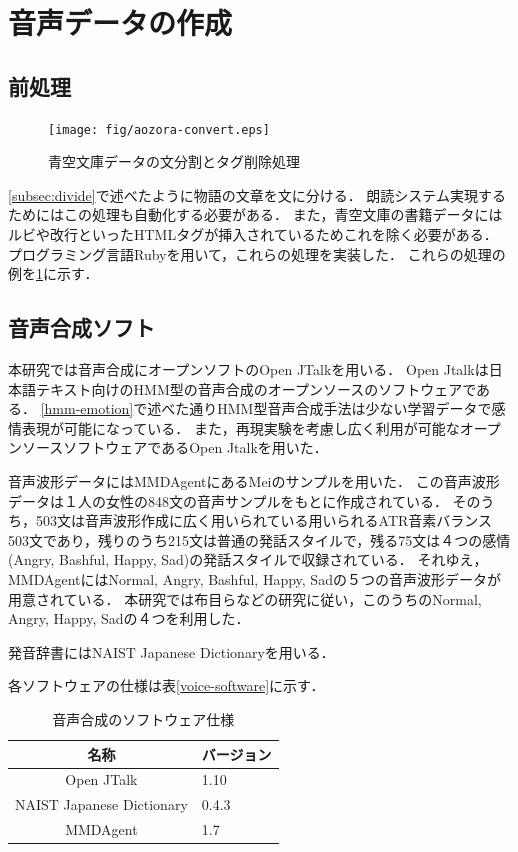 \section{音声データの作成}
\subsection{前処理}

\begin{figure}[hb]
  \begin{center}
    \texttt{[image: fig/aozora-convert.eps]}
    \caption{青空文庫データの文分割とタグ削除処理}
    \label{fig:aozora-convert}
  \end{center}
\end{figure}


\ref{subsec:divide}で述べたように物語の文章を文に分ける．
朗読システム実現するためにはこの処理も自動化する必要がある．
また，青空文庫の書籍データにはルビや改行といったHTMLタグが挿入されているためこれを除く必要がある．
プログラミング言語Ruby\cite{ruby}を用いて，これらの処理を実装した．
これらの処理の例を\ref{fig:aozora-convert}に示す．

\subsection{音声合成ソフト}
本研究では音声合成にオープンソフトのOpen JTalk\cite{jtalk}を用いる．
Open Jtalkは日本語テキスト向けのHMM型の音声合成のオープンソースのソフトウェアである．
\ref{hmm-emotion}で述べた通りHMM型音声合成手法は少ない学習データで感情表現が可能になっている．
また，再現実験を考慮し広く利用が可能なオープンソースソフトウェアであるOpen Jtalkを用いた．



音声波形データにはMMDAgent\cite{mei}にあるMeiのサンプルを用いた．
この音声波形データは１人の女性の848文の音声サンプルをもとに作成されている．
そのうち，503文は音声波形作成に広く用いられている用いられるATR音素バランス503文\cite{atr}であり，残りのうち215文は普通の発話スタイルで，残る75文は４つの感情(Angry, Bashful, Happy, Sad)の発話スタイルで収録されている．
それゆえ，MMDAgentにはNormal, Angry, Bashful, Happy, Sadの５つの音声波形データが用意されている．
本研究では布目ら\cite{fume}などの研究に従い，このうちのNormal, Angry, Happy, Sadの４つを利用した．


発音辞書にはNAIST Japanese Dictionary\cite{naist}を用いる．

各ソフトウェアの仕様は表\ref{voice-software}に示す．
\begin{table}[ht]
  \begin{center}
  \caption{音声合成のソフトウェア仕様}
  \label{}
  \begin{tabular}{|c|l|}
    \hline
    名称 & バージョン \\ \hline \hline
    Open JTalk & 1.10 \\ \hline
    NAIST Japanese Dictionary & 0.4.3  \\ \hline
    MMDAgent & 1.7 \\ \hline
  \end{tabular}
  \end{center}
\end{table}

